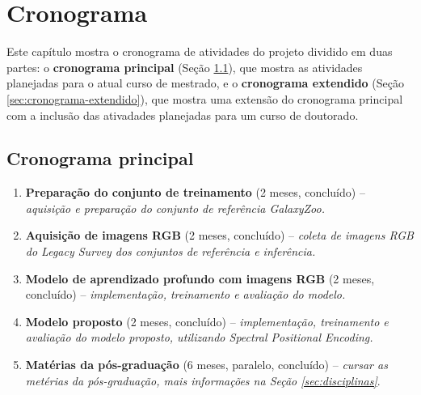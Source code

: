 \chapter{Cronograma}
\label{cap:cronograma}

\begin{overview}
  Este capítulo mostra o cronograma de atividades do projeto dividido em duas partes: o \textbf{cronograma principal} (Seção \ref{sec:cronograma-principal}), que mostra as atividades planejadas para o atual curso de mestrado, e o \textbf{cronograma extendido} (Seção \ref{sec:cronograma-extendido}), que mostra uma extensão do cronograma principal com a inclusão das ativadades planejadas para um curso de doutorado.
\end{overview}


\section{Cronograma principal}
\label{sec:cronograma-principal}
\begin{enumerate}
  \item \textbf{Preparação do conjunto de treinamento} (2 meses, concluído) -- \textit{aquisição e preparação do conjunto de referência GalaxyZoo.}
  \item \textbf{Aquisição de imagens RGB} (2 meses, concluído) -- \textit{coleta de imagens RGB do Legacy Survey dos conjuntos de referência e inferência.}
  \item \textbf{Modelo de aprendizado profundo com imagens RGB} (2 meses, concluído) -- \textit{implementação, treinamento e avaliação do modelo.}
  \item \textbf{Modelo proposto} (2 meses, concluído) -- \textit{implementação, treinamento e avaliação do modelo proposto, utilizando Spectral Positional Encoding.}
  \item \textbf{Matérias da pós-graduação} (6 meses, paralelo, concluído) -- \textit{cursar as metérias da pós-graduação, mais informações na Seção \ref{sec:disciplinas}}.
\end{enumerate}



